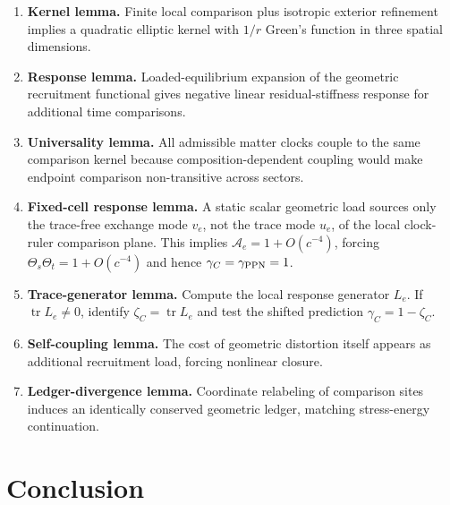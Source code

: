 \documentclass[11pt]{article}
\theoremstyle{remark}
\begin{document}
\begin{enumerate}
\item \textbf{Kernel lemma.}  Finite local comparison plus isotropic exterior refinement implies a quadratic elliptic kernel with \(1/r\) Green's function in three spatial dimensions.
\item \textbf{Response lemma.}  Loaded-equilibrium expansion of the geometric recruitment functional gives negative linear residual-stiffness response for additional time comparisons.
\item \textbf{Universality lemma.}  All admissible matter clocks couple to the same comparison kernel because composition-dependent coupling would make endpoint comparison non-transitive across sectors.
\item \textbf{Fixed-cell response lemma.}  A static scalar geometric load sources only the trace-free exchange mode \(v_e\), not the trace mode \(u_e\), of the local clock-ruler comparison plane.  This implies \(\mathcal A_e=1+O(c^{-4})\), forcing \(\Theta_s\Theta_t=1+O(c^{-4})\) and hence \(\gamma_C=\gamma_{\rm PPN}=1\).
\item \textbf{Trace-generator lemma.}  Compute the local response generator \(L_e\).  If \(\operatorname{tr}L_e\neq0\), identify \(\zeta_C=\operatorname{tr}L_e\) and test the shifted prediction \(\gamma_C=1-\zeta_C\).
\item \textbf{Self-coupling lemma.}  The cost of geometric distortion itself appears as additional recruitment load, forcing nonlinear closure.
\item \textbf{Ledger-divergence lemma.}  Coordinate relabeling of comparison sites induces an identically conserved geometric ledger, matching stress-energy continuation.
\end{enumerate}

\section{Conclusion}
\end{document}
